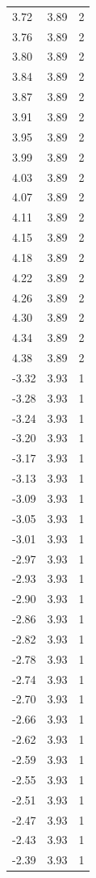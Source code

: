\begin{longtable}{lrr}
  3.72 & 3.89 & 2 \\
  3.76 & 3.89 & 2 \\
  3.80 & 3.89 & 2 \\
  3.84 & 3.89 & 2 \\
  3.87 & 3.89 & 2 \\
  3.91 & 3.89 & 2 \\
  3.95 & 3.89 & 2 \\
  3.99 & 3.89 & 2 \\
  4.03 & 3.89 & 2 \\
  4.07 & 3.89 & 2 \\
  4.11 & 3.89 & 2 \\
  4.15 & 3.89 & 2 \\
  4.18 & 3.89 & 2 \\
  4.22 & 3.89 & 2 \\
  4.26 & 3.89 & 2 \\
  4.30 & 3.89 & 2 \\
  4.34 & 3.89 & 2 \\
  4.38 & 3.89 & 2 \\
  -3.32 & 3.93 & 1 \\
  -3.28 & 3.93 & 1 \\
  -3.24 & 3.93 & 1 \\
  -3.20 & 3.93 & 1 \\
  -3.17 & 3.93 & 1 \\
  -3.13 & 3.93 & 1 \\
  -3.09 & 3.93 & 1 \\
  -3.05 & 3.93 & 1 \\
  -3.01 & 3.93 & 1 \\
  -2.97 & 3.93 & 1 \\
  -2.93 & 3.93 & 1 \\
  -2.90 & 3.93 & 1 \\
  -2.86 & 3.93 & 1 \\
  -2.82 & 3.93 & 1 \\
  -2.78 & 3.93 & 1 \\
  -2.74 & 3.93 & 1 \\
  -2.70 & 3.93 & 1 \\
  -2.66 & 3.93 & 1 \\
  -2.62 & 3.93 & 1 \\
  -2.59 & 3.93 & 1 \\
  -2.55 & 3.93 & 1 \\
  -2.51 & 3.93 & 1 \\
  -2.47 & 3.93 & 1 \\
  -2.43 & 3.93 & 1 \\
  -2.39 & 3.93 & 1 \\

\end{longtable}
